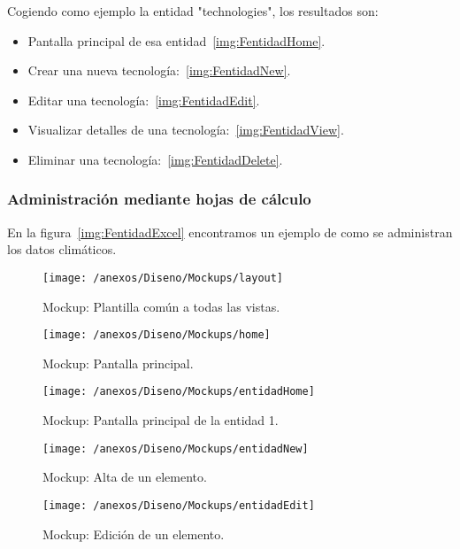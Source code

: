 Cogiendo como ejemplo la entidad "technologies", los resultados son: 

\begin{itemize}
	\item Pantalla principal de esa entidad~\ref{img:FentidadHome}.
	\item Crear una nueva tecnología:~\ref{img:FentidadNew}.
	\item Editar una tecnología:~\ref{img:FentidadEdit}.
	\item Visualizar detalles de una tecnología:~\ref{img:FentidadView}.
	\item Eliminar una tecnología:~\ref{img:FentidadDelete}.
\end{itemize}

\subsubsection{Administración mediante hojas de cálculo} 

En la figura~\ref{img:FentidadExcel} encontramos un ejemplo de como se administran los datos climáticos. 


\begin{figure}[h]
	\centering
	\texttt{[image: /anexos/Diseno/Mockups/layout]}
	\caption{Mockup: Plantilla común a todas las vistas.}
	\label{img:layout}
\end{figure}

\begin{figure}[h]
	\centering
	\texttt{[image: /anexos/Diseno/Mockups/home]}
	\caption{Mockup: Pantalla principal.}
	\label{img:home}
\end{figure}

\begin{figure}[h]
	\centering
	\texttt{[image: /anexos/Diseno/Mockups/entidadHome]}
	\caption{Mockup: Pantalla principal de la entidad 1.}
	\label{img:entidadHome}
\end{figure}

\begin{figure}[h]
	\centering
	\texttt{[image: /anexos/Diseno/Mockups/entidadNew]}
	\caption{Mockup: Alta de un elemento.}
	\label{img:entidadNew}
\end{figure}

\begin{figure}[h]
	\centering
	\texttt{[image: /anexos/Diseno/Mockups/entidadEdit]}
	\caption{Mockup: Edición de un elemento.}
	\label{img:entidadEdit}
\end{figure}

